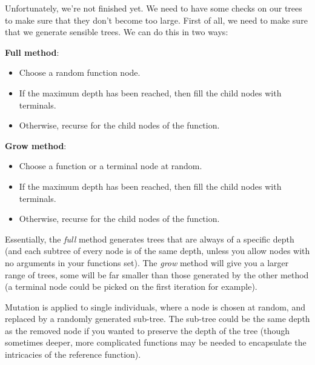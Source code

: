 Unfortunately, we're not finished yet. We need to have some checks on
our trees to make sure that they don't become too large. First of all,
we need to make sure that we generate sensible trees. We can do this
in two ways:

\begin{description}
  \item \textbf{Full method}:
    \begin{itemize}
      \item Choose a random function node.
      \item If the maximum depth has been reached, then fill the child
        nodes with terminals.
      \item Otherwise, recurse for the child nodes of the function.
    \end{itemize}
  \item \textbf{Grow method}:
    \begin{itemize}
      \item Choose a function or a terminal node at random.
      \item If the maximum depth has been reached, then fill the child
        nodes with terminals.
      \item Otherwise, recurse for the child nodes of the function.
    \end{itemize}
\end{description}

Essentially, the \textit{full} method generates trees that are always
of a specific depth (and each subtree of every node is of the same
depth, unless you allow nodes with no arguments in your functions
set). The \textit{grow} method will give you a larger range of trees,
some will be far smaller than those generated by the other method (a
terminal node could be picked on the first iteration for example).

Mutation is applied to single individuals, where a node is chosen at
random, and replaced by a randomly generated sub-tree. The sub-tree
could be the same depth as the removed node if you wanted to preserve
the depth of the tree (though sometimes deeper, more complicated
functions may be needed to encapsulate the intricacies of the
reference function).
